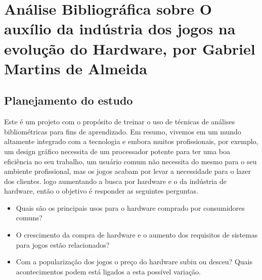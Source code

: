 \chapter{Análise Bibliográfica sobre O auxílio da indústria dos jogos na evolução do Hardware, por Gabriel Martins de Almeida}

\section{Planejamento do estudo}

Este é um projeto com o propósito de treinar o uso de técnicas de análises bibliométricas para fins de aprendizado. Em resumo, vivemos em um mundo altamente integrado com a tecnologia e embora muitos profissionais, por exemplo, um design gráfico necessita de um processador potente para ter uma boa eficiência no seu trabalho, um usuário comum não necessita do mesmo para o seu ambiente profissional, mas os jogos acabam por levar a necessidade para o lazer dos clientes. logo aumentando a busca por hardware e o da indústria de hardware, então o objetivo é responder as seguintes perguntas.

\begin{itemize}
    \item Quais são os principais usos para o hardware comprado por consumidores comuns?
    \item O crescimento da compra de hardware e o aumento dos requisitos de sistemas para jogos estão relacionados?
    \item Com a popularização dos jogos o preço do hardware subiu ou desceu? Quais acontecimentos podem está ligados a esta possível variação.
\end{itemize}
